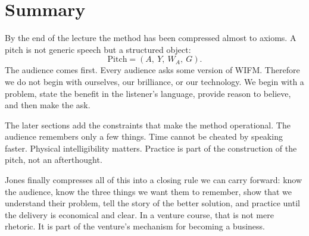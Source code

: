 \section{Summary}

By the end of the lecture the method has been compressed almost to axioms. A pitch is not generic speech but a structured object:
\[
\text{Pitch}=(A,\ Y,\ W_A,\ G).
\]
The audience comes first. Every audience asks some version of WIFM. Therefore we do not begin with ourselves, our brilliance, or our technology. We begin with a problem, state the benefit in the listener's language, provide reason to believe, and then make the ask.

The later sections add the constraints that make the method operational. The audience remembers only a few things. Time cannot be cheated by speaking faster. Physical intelligibility matters. Practice is part of the construction of the pitch, not an afterthought.

Jones finally compresses all of this into a closing rule we can carry forward: know the audience, know the three things we want them to remember, show that we understand their problem, tell the story of the better solution, and practice until the delivery is economical and clear. In a venture course, that is not mere rhetoric. It is part of the venture's mechanism for becoming a business.